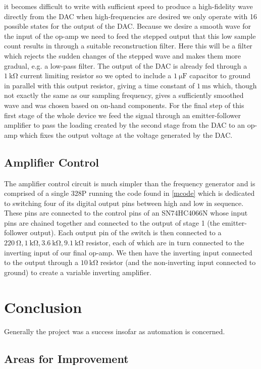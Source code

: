 \documentclass[10pt]{article}
\theoremstyle{definition}
\begin{document}
it becomes difficult to write with sufficient speed to produce a high-fidelity wave directly from the DAC
when high-frequencies are desired we only operate with 16 possible states for the output of the DAC. Because
we desire a smooth wave for the input of the op-amp we need to feed the stepped output that this
low sample count results in through a suitable reconstruction filter. Here this will be a filter which rejects
the sudden changes of the stepped wave and makes them more gradual, e.g. a low-pass filter. The output
of the DAC is already fed through a $\qty{1}{\kilo\ohm}$ current limiting resistor so we opted to include
a $\qty{1}{\micro\farad}$ capacitor to ground in parallel with this output resistor, giving a time constant of
$\qty{1}{\milli\second}$ which, though not exactly the same as our sampling frequency, gives a sufficiently smoothed wave
and was chosen based on on-hand components. For the final step of this first stage of the whole device we feed the signal
through an emitter-follower amplifier to pass the loading created by the second stage
from the DAC to an op-amp which fixes the output voltage at the voltage generated by the DAC.
\subsection{Amplifier Control}
The amplifier control circuit is much simpler than the frequency generator and is comprised
of a single 328P running the code found in \ref{mcode} which is dedicated to switching four of its digital output pins between high and
low in sequence. These pins are connected to the control pins of an SN74HC4066N \cite{TI:sn74hc4066} whose input pins are chained
together and connected to the output of stage 1 (the emitter-follower output). Each output pin of the switch
is then connected to a $\qty{220}{\ohm},\qty{1}{\kilo\ohm}, \qty{3.6}{\kilo\ohm}, \qty{9.1}{\kilo\ohm}$ resistor, each of which are
in turn connected to the inverting input of our final op-amp. We then have the inverting input connected to the output
through a $\qty{10}{\kilo\ohm}$ resistor (and the non-inverting input connected to ground) to create a variable
inverting amplifier.
\section{Conclusion}
Generally the project was a success insofar as automation is concerned.
\subsection{Areas for Improvement}
\end{document}
